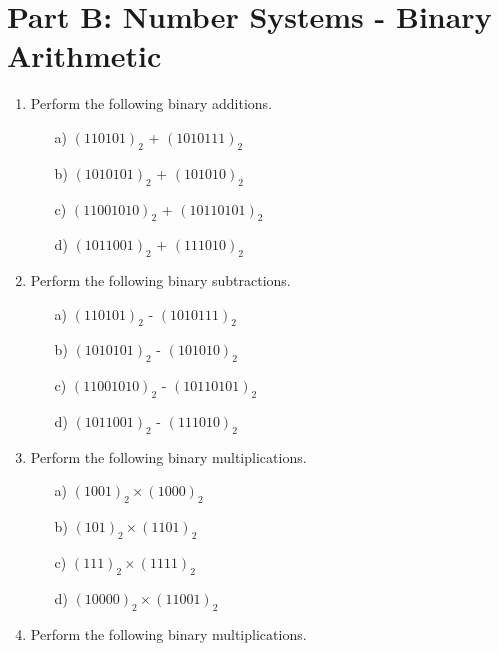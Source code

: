 \documentclass[]{report}
\begin{document}
\section*{Part B: Number Systems - Binary Arithmetic}
\begin{enumerate}
\item Perform the following binary additions.
  \begin{multicols}{2}
    \begin{itemize}
    \item[a)] $(110101)_{2}$ + $(1010111)_{2}$
    \item[b)] $(1010101)_{2}$ + $(101010)_{2}$
    \item[c)] $(11001010)_{2}$ + $(10110101)_{2}$
    \item[d)] $(1011001)_{2}$ + $(111010)_{2}$
    \end{itemize}
  \end{multicols}

\item Perform the following binary subtractions.
  \begin{multicols}{2}
    \begin{itemize}
    \item[a)] $(110101)_{2}$ - $(1010111)_{2}$
    \item[b)] $(1010101)_{2}$ - $(101010)_{2}$
    \item[c)] $(11001010)_{2}$ - $(10110101)_{2}$
    \item[d)] $(1011001)_{2}$ - $(111010)_{2}$
    \end{itemize}
  \end{multicols}


\item Perform the following binary multiplications.
\begin{multicols}{2}
\begin{itemize}
\item[a)] $(1001)_{2}\times( 1000)_{2}$  %
\item[b)] $(101)_{2}\times(1101)_{2}$ %
\item[c)] $(111)_{2}\times(1111)_{2}$ %
\item[d)] $(10000)_{2}\times(11001)_{2}$    %
\end{itemize}
 \end{multicols}



\item Perform the following binary multiplications.


\end{enumerate}
\end{document}

